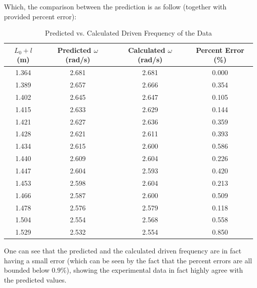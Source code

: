 \documentclass{article}
\begin{document}
\hfil

Which, the comparison between the prediction is as follow (together with provided percent error):
\begin{table}[h!]
\centering
\begin{tabular}{c|c|c|c}
\hline
\textbf{$L_0+l$ (m)} &
\textbf{Predicted $\omega$ (rad/s)} &
\textbf{Calculated $\omega$ (rad/s)} &
\textbf{Percent Error (\%)} \\
\hline
\hline
1.364 & 2.681 & 2.681 & 0.000 \\
1.389 & 2.657 & 2.666 & 0.354 \\
1.402 & 2.645 & 2.647 & 0.105 \\
1.415 & 2.633 & 2.629 & 0.144 \\
1.421 & 2.627 & 2.636 & 0.359 \\
1.428 & 2.621 & 2.611 & 0.393 \\
1.434 & 2.615 & 2.600 & 0.586 \\
1.440 & 2.609 & 2.604 & 0.226 \\
1.447 & 2.604 & 2.593 & 0.420 \\
1.453 & 2.598 & 2.604 & 0.213 \\
1.466 & 2.587 & 2.600 & 0.509 \\
1.478 & 2.576 & 2.579 & 0.118 \\
1.504 & 2.554 & 2.568 & 0.558 \\
1.529 & 2.532 & 2.554 & 0.850 \\
\hline
\end{tabular}
\caption{Predicted vs. Calculated Driven Frequency of the Data}
\label{tab:compare_w}
\end{table}

One can see that the predicted and the calculated driven frequency are in fact having a small error (which can be seen by the fact that the percent errors are all bounded below $0.9\%$), showing the experimental data in fact highly agree with the predicted values.

\newpage
\end{document}
